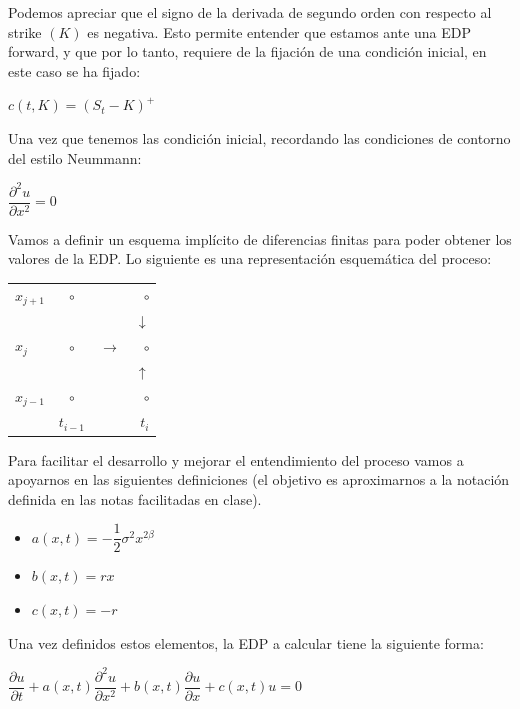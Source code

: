 \documentclass[titlepage]{article}
\begin{document}
Podemos apreciar que el signo de la derivada de segundo orden con respecto al strike $(K)$ es negativa. Esto permite entender que estamos ante una EDP forward, y que por lo tanto, requiere de la fijación de una condición inicial, en este caso se ha fijado:

\begin{center}
	$c(t, K) = (S_{t} - K)^{+}$
\end{center}

Una vez que tenemos las condición inicial, recordando las condiciones de contorno del estilo Neummann:

\begin{center}
	$\dfrac{\partial^{2}u}{\partial{x}^{2}} = 0$
\end{center}

Vamos a definir un esquema implícito de diferencias finitas para poder obtener los valores de la EDP. Lo siguiente es una representación esquemática del proceso:

\begin{center}
	\begin{tabular}{ l c c r }
	\hline
		$x_{j+1}$ & $\circ$ & & $\circ$ \\
		 & & & $\downarrow$ \\
		$x_{j}$ & $\circ$ & $\longrightarrow$ & $\circ$ \\
		 & & & $\uparrow$ \\
		$x_{j-1}$ & $\circ$ &  & $\circ$ \\		
		 & $t_{i-1}$ &  &$t_{i}$ \\	
	\hline	
	\end{tabular}
\end{center}

Para facilitar el desarrollo y mejorar el entendimiento del proceso vamos a apoyarnos en las siguientes definiciones (el objetivo es aproximarnos a la notación definida en las notas facilitadas en clase).

\begin{itemize}
	\item[] $a(x, t) = -\dfrac{1}{2} \sigma^{2} x^{2\beta}$ 
	\item[] $b(x, t) = rx$
	\item[] $c(x, t) = -r$	
\end{itemize}

Una vez definidos estos elementos, la EDP a calcular tiene la siguiente forma:

\begin{center}
	$\dfrac{\partial u}{\partial t} + a(x, t) \dfrac{\partial^{2}u}{\partial{x}^{2}} + b(x, t) \dfrac{\partial u}{\partial x} + c(x, t) u = 0$
\end{center}
\end{document}
